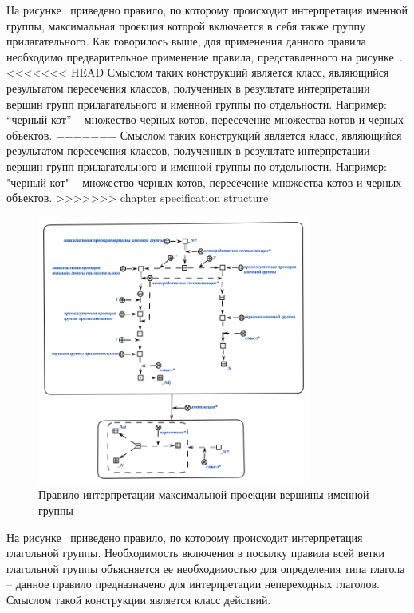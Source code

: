 На рисунке~\textit{} приведено правило, по которому происходит интерпретация именной группы, максимальная проекция которой включается в себя также группу прилагательного.
Как говорилось выше, для применения данного правила необходимо предварительное применение правила, представленного на рисунке~\textit{}.
<<<<<<< HEAD
Смыслом таких конструкций является класс, являющийся результатом пересечения классов, полученных в результате интерпретации вершин групп прилагательного и именной группы по отдельности. Например: ``черный кот''{} -- множество черных котов, пересечение множества котов и черных объектов. %
=======
Смыслом таких конструкций является класс, являющийся результатом пересечения классов, полученных в результате интерпретации вершин групп прилагательного и именной группы по отдельности.
Например: "черный кот"{} -- множество черных котов, пересечение множества котов и черных объектов. %
>>>>>>> chapter specification structure

\begin{figure}[h]
    \centering
    \includegraphics[width=0.8\textwidth]{images/part2/chapter_lang/d_sem_2.png}
    \caption{Правило интерпретации максимальной проекции вершины именной группы}
    \label{fig:d_sem_2}
\end{figure}

На рисунке~\textit{} приведено правило, по которому происходит интерпретация глагольной группы.
Необходимость включения в посылку правила всей ветки глагольной группы объясняется ее необходимостью для определения типа глагола -- данное правило предназначено для интерпретации непереходных глаголов.
Смыслом такой конструкции является класс действий.

